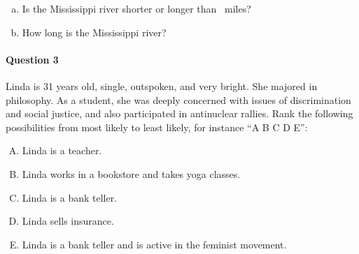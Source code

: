 \begin{multicols}{2}
\begin{enumerate}[(a)]
\item Is the Mississippi river shorter or longer than \mississippi\ miles?
\item How long is the Mississippi river?
\end{enumerate}


\paragraph{Question 3}

Linda is 31 years old, single, outspoken, and very bright. She
majored in philosophy. As a student, she was deeply concerned with issues of
discrimination and social justice, and also participated in antinuclear rallies.
Rank the following possibilities from most likely to least likely, for instance “A
B C D E”:
\begin{enumerate}[(A)]
\item Linda is a teacher.
\item Linda works in a bookstore and takes yoga classes.
\item Linda is a bank teller.
\item Linda sells insurance.
\item Linda is a bank teller and is active in the feminist movement.
\end{enumerate}

\end{multicols}

